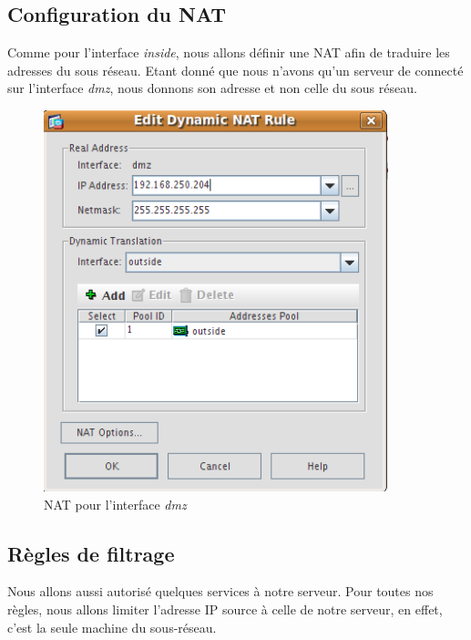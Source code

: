 \documentclass[a4paper,12pt]{article}
\begin{document}
\subsection{Configuration du NAT}
Comme pour l'interface \textit{inside}, nous allons définir une NAT afin de traduire les adresses du sous réseau. Etant donné que nous n'avons qu'un serveur
de connecté sur l'interface \textit{dmz}, nous donnons son adresse et non celle du sous réseau.
\begin{figure}[H]
	\center
	\includegraphics[width=10cm]{img/11-natdmzoutside.png}
	\caption{NAT pour l'interface \textit{dmz}}
\end{figure}

\subsection{Règles de filtrage}
Nous allons aussi autorisé quelques services à notre serveur. Pour toutes nos règles, nous allons limiter l'adresse IP source à celle de notre serveur, en effet,
c'est la seule machine du sous-réseau.
\end{document}

